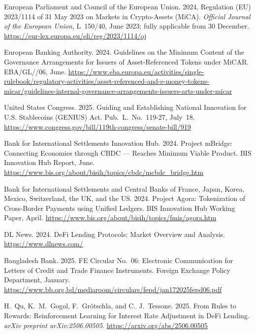 \documentclass[12pt, a4paper]{report}
\begin{document}
{\begin{enumerate}[label={[\arabic*]}]
\item European Parliament and Council of the European Union. 2024. Regulation (EU) 2023/1114 of 31 May 2023 on Markets in Crypto-Assets (MiCA). \emph{Official Journal of the European Union}, L~150/40, June 2023; fully applicable from 30 December. \url{https://eur-lex.europa.eu/eli/reg/2023/1114/oj}

\item European Banking Authority. 2024. Guidelines on the Minimum Content of the Governance Arrangements for Issuers of Asset-Referenced Tokens under MiCAR. EBA/GL//06, June. \url{https://www.eba.europa.eu/activities/single-rulebook/regulatory-activities/asset-referenced-and-e-money-tokens-micar/guidelines-internal-governance-arrangements-issuers-arts-under-micar}

\item United States Congress. 2025. Guiding and Establishing National Innovation for U.S. Stablecoins (GENIUS) Act. Pub.~L.~No.~119-27, July~18. \url{https://www.congress.gov/bill/119th-congress/senate-bill/919}

\item Bank for International Settlements Innovation Hub. 2024. Project mBridge: Connecting Economies through CBDC --- Reaches Minimum Viable Product. BIS Innovation Hub Report, June. \url{https://www.bis.org/about/bisih/topics/cbdc/mcbdc_bridge.htm}

\item Bank for International Settlements and Central Banks of France, Japan, Korea, Mexico, Switzerland, the UK, and the US. 2024. Project Agora: Tokenization of Cross-Border Payments using Unified Ledgers. BIS Innovation Hub Working Paper, April. \url{https://www.bis.org/about/bisih/topics/fmis/agora.htm}

\item DL News. 2024. DeFi Lending Protocols: Market Overview and Analysis. \url{https://www.dlnews.com/}

\item Bangladesh Bank. 2025. FE Circular No.~06: Electronic Communication for Letters of Credit and Trade Finance Instruments. Foreign Exchange Policy Department, January. \url{https://www.bb.org.bd/mediaroom/circulars/fepd/jan172025fepd06.pdf}

\item H.~Qu, K.~M.~Gogol, F.~Gr\"{o}tschla, and C.~J.~Tessone. 2025. From Rules to Rewards: Reinforcement Learning for Interest Rate Adjustment in DeFi Lending. \emph{arXiv preprint arXiv:2506.00505}. \url{https://arxiv.org/abs/2506.00505}


\end{enumerate}}
\end{document}
